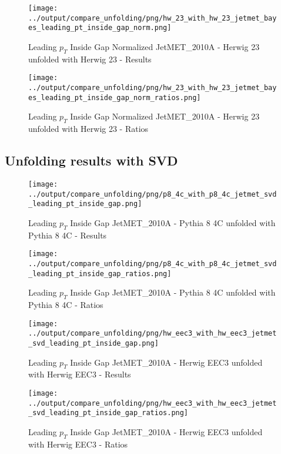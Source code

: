 \documentclass[11pt]{book}
\begin{document}
\begin{figure}[ht]
\centering
\texttt{[image: ../output/compare\_unfolding/png/hw\_23\_with\_hw\_23\_jetmet\_bayes\_leading\_pt\_inside\_gap\_norm.png]}
\caption{Leading $p_{T}$ Inside Gap Normalized JetMET\_2010A - Herwig 23 unfolded with Herwig 23 - Results}
\label{hw_23_hw_23_jetmet_bayes_leading_pt_inside_gap_norm_a}
\end{figure}

\begin{figure}[ht]
\centering
\texttt{[image: ../output/compare\_unfolding/png/hw\_23\_with\_hw\_23\_jetmet\_bayes\_leading\_pt\_inside\_gap\_norm\_ratios.png]}
\caption{Leading $p_{T}$ Inside Gap Normalized JetMET\_2010A - Herwig 23 unfolded with Herwig 23 - Ratios}
\label{hw_23_hw_23_jetmet_bayes_leading_pt_inside_gap_norm_b}
\end{figure}


\clearpage
\subsection{Unfolding results with SVD}

\begin{figure}[ht]
\centering
\texttt{[image: ../output/compare\_unfolding/png/p8\_4c\_with\_p8\_4c\_jetmet\_svd\_leading\_pt\_inside\_gap.png]}
\caption{Leading $p_{T}$ Inside Gap JetMET\_2010A - Pythia 8 4C unfolded with Pythia 8 4C - Results}
\label{p8_p8_jetmet_svd_leading_pt_inside_gap_a}
\end{figure}

\begin{figure}[ht]
\centering
\texttt{[image: ../output/compare\_unfolding/png/p8\_4c\_with\_p8\_4c\_jetmet\_svd\_leading\_pt\_inside\_gap\_ratios.png]}
\caption{Leading $p_{T}$ Inside Gap JetMET\_2010A - Pythia 8 4C unfolded with Pythia 8 4C - Ratios}
\label{p8_p8_jetmet_svd_leading_pt_inside_gap_b}
\end{figure}

\begin{figure}[ht]
\centering
\texttt{[image: ../output/compare\_unfolding/png/hw\_eec3\_with\_hw\_eec3\_jetmet\_svd\_leading\_pt\_inside\_gap.png]}
\caption{Leading $p_{T}$ Inside Gap JetMET\_2010A - Herwig EEC3 unfolded with Herwig EEC3 - Results}
\label{hw_eec3_hw_eec3_jetmet_svd_leading_pt_inside_gap_a}
\end{figure}

\begin{figure}[ht]
\centering
\texttt{[image: ../output/compare\_unfolding/png/hw\_eec3\_with\_hw\_eec3\_jetmet\_svd\_leading\_pt\_inside\_gap\_ratios.png]}
\caption{Leading $p_{T}$ Inside Gap JetMET\_2010A - Herwig EEC3 unfolded with Herwig EEC3 - Ratios}
\label{hw_eec3_hw_eec3_jetmet_svd_leading_pt_inside_gap_b}
\end{figure}
\end{document}
